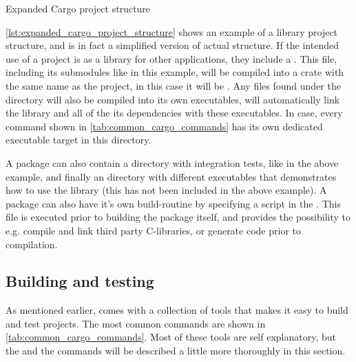 \begin{listing}
\caption{Expanded Cargo project structure}
\label{lst:expanded_cargo_project_structure}
\end{listing}

\autoref{lst:expanded_cargo_project_structure} shows an example of a library project structure, and is in fact a simplified version of \cargos actual structure.
If the intended use of a project is as a library for other applications, they include a .
This file, including its submodules like  in this example, will be compiled into a \rust crate with the same name as the project, in this case it will be .
Any files found under the  directory will also be compiled into its own executables, \cargo will automatically link the library and all of the its dependencies with these executables.
In \cargos case, every command shown in \autoref{tab:common_cargo_commands} has its own dedicated executable target in this directory.

A package can also contain a  directory with integration tests, like in the above example, and finally an  directory with different executables that demonstrates how to use the library (this has not been included in the above example).
A package can also have it's own build-routine by specifying a  script in the .
This file is executed prior to building the package itself, and provides the possibility to e.g. compile and link third party C-libraries, or generate code prior to compilation.

\subsection{Building and testing}

As mentioned earlier, \cargo comes with a collection of tools that makes it easy to build and test \rust projects.
The most common commands are shown in \autoref{tab:common_cargo_commands}.
Most of these tools are self explanatory, but the  and the  commands will be described a little more thoroughly in this section.

